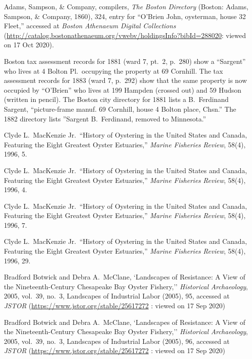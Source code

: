 \begin{thebibliography}{999}
	Adams, Sampson, \& Company, compilers, \textit{The Boston Directory} (Boston: Adams, Sampson, \& Company, 1860), 324, entry for ``O'Brien John, oysterman, house 32 Fleet,'' accessed at \textit{Boston Athenaeum Digital Collections} (\url{http://catalog.bostonathenaeum.org/vwebv/holdingsInfo?bibId=288020}: viewed on 17 Oct 2020).
	
	Boston tax assessment records for 1881 (ward 7, pt.\ 2, p.\ 280) show a ``Sargent'' who lives at 4 Bolton Pl.\ occupying the property at 69 Cornhill. The tax assessment records for 1883 (ward 7, p.\ 292) show that the same property is now occupied by ``O'Brien'' who lives at 199 Hampden (crossed out) and 59 Hudson (written in pencil). The Boston city directory for 1881 lists a B.\ Ferdinand Sargent, ``picture-frame manuf. 69 Cornhill, house 4 Bolton place, Chsn.'' The 1882 directory lists ''Sargent B.\ Ferdinand, removed to Minnesota.'' 
	
	Clyde L.\ MacKenzie Jr.\, ``History of Oystering in the United States and Canada, Featuring the Eight Greatest Oyster Estuaries,'' \textit{Marine Fisheries Review}, 58(4), 1996, 5. 
	
	Clyde L.\ MacKenzie Jr.\, ``History of Oystering in the United States and Canada, Featuring the Eight Greatest Oyster Estuaries,'' \textit{Marine Fisheries Review}, 58(4), 1996, 4. 
	
	Clyde L.\ MacKenzie Jr.\, ``History of Oystering in the United States and Canada, Featuring the Eight Greatest Oyster Estuaries,'' \textit{Marine Fisheries Review}, 58(4), 1996, 7.
	
	Clyde L.\ MacKenzie Jr.\, ``History of Oystering in the United States and Canada, Featuring the Eight Greatest Oyster Estuaries,'' \textit{Marine Fisheries Review}, 58(4), 1996, 29.
	
	Bradford Botwick and Debra A.\ McClane, `Landscapes of Resistance: A View of the Nineteenth-Century Chesapeake Bay Oyster Fishery,''  \textit{Historical Archaeology}, 2005, vol.\ 39, no.\ 3, Landscapes of Industrial Labor (2005), 95, accessed at \textit{JSTOR} (\url{https://www.jstor.org/stable/25617272} : viewed on 17 Sep 2020)
	
		Bradford Botwick and Debra A.\ McClane, `Landscapes of Resistance: A View of the Nineteenth-Century Chesapeake Bay Oyster Fishery,''  \textit{Historical Archaeology}, 2005, vol.\ 39, no.\ 3, Landscapes of Industrial Labor (2005), 96, accessed at \textit{JSTOR} (\url{https://www.jstor.org/stable/25617272} : viewed on 17 Sep 2020)
		

\end{thebibliography}
